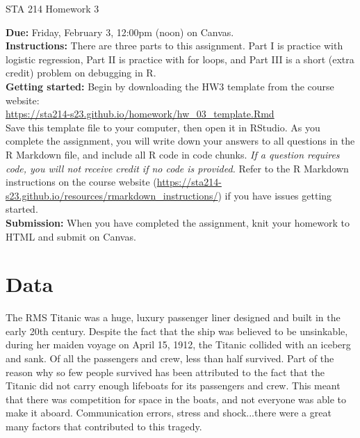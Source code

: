 \documentclass[11pt]{article}
\begin{document}
\begin{center}
\Large
STA 214 Homework 3\\
\normalsize
\vspace{5mm}
\end{center}

\noindent \textbf{Due:} Friday, February 3, 12:00pm (noon) on Canvas.\\ 

\noindent \textbf{Instructions:} There are three parts to this assignment. Part I is practice with logistic regression, Part II is practice with for loops, and Part III is a short (extra credit) problem on debugging in R.\\

\noindent \textbf{Getting started:} Begin by downloading the HW3 template from the course website:\\

\url{https://sta214-s23.github.io/homework/hw_03_template.Rmd}\\

\noindent Save this template file to your computer, then open it in RStudio. As you complete the assignment, you will write down your answers to all questions in the R Markdown file, and include all R code in code chunks. \textit{If a question requires code, you will not receive credit if no code is provided.} Refer to the R Markdown instructions on the course website (\url{https://sta214-s23.github.io/resources/rmarkdown_instructions/}) if you have issues getting started.\\

\noindent \textbf{Submission:} When you have completed the assignment, knit your homework to HTML and submit on Canvas.

\section*{Data}

The RMS Titanic was a huge, luxury passenger liner designed and built in the early 20th century. Despite the fact that the ship was believed to be unsinkable, during her maiden voyage on April 15, 1912, the Titanic collided with an iceberg and sank. Of all the passengers and crew, less than half survived. Part of the reason why so few people survived has been attributed to the fact that the Titanic did not carry enough lifeboats for its passengers and crew. This meant that there was competition for space in the boats, and not everyone was able to make it aboard. Communication errors, stress and shock...there were a great many factors that contributed to this tragedy.\\
\end{document}
